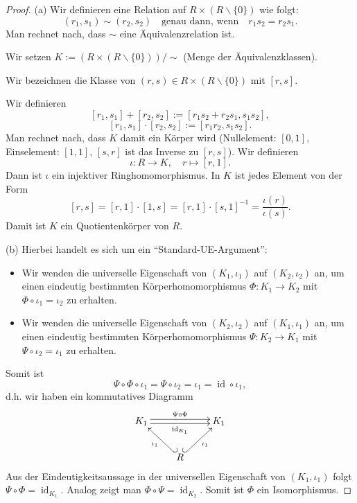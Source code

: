 \documentclass[a4paper, twoside, 11pt, ngerman]{report}
\renewcommand{\setminus}{\smallsetminus}
\DeclareMathOperator{\ident}{id}
\theoremstyle{definistyle}
\theoremstyle{remark}
\begin{document}
\begin{proof}
(a) Wir definieren eine Relation auf $R \times (R \setminus \{0\})$ wie folgt:
\[
(r_1, s_1) \sim (r_2, s_2) \quad \text{genau dann, wenn} \quad r_1 s_2 = r_2 s_1.
\]
Man rechnet nach, dass $\sim$ eine Äquivalenzrelation ist. 

Wir setzen $K := (R \times (R \setminus \{0\}))/\sim$ (Menge der Äquivalenzklassen).

Wir bezeichnen die Klasse von $(r, s) \in R \times (R \setminus \{0\})$ mit $[r, s]$.

Wir definieren 
\[
[r_1, s_1] + [r_2, s_2] := [r_1 s_2 + r_2 s_1, s_1 s_2],
\]
\[
[r_1, s_1] \cdot [r_2, s_2] := [r_1 r_2, s_1 s_2].
\]
Man rechnet nach, dass $K$ damit ein Körper wird (Nullelement: $[0,1]$, Einselement: $[1,1]$, $[s,r]$ ist das Inverse zu $[r,s]$). Wir definieren 
\[\iota \colon R \to K, \quad r \mapsto [r,1].\]
Dann ist $\iota$ ein injektiver Ringhomomorphismus.
In $K$ ist jedes Element von der Form
\[
[r, s] = [r,1] \cdot [1,s] = [r,1] \cdot [s,1]^{-1} = \frac{\iota(r)}{\iota(s)}.
\]
Damit ist $K$ ein Quotientenkörper von $R$.

(b) Hierbei handelt es sich um ein "`Standard-UE-Argument"':
\begin{itemize}
\item Wir wenden die universelle Eigenschaft von $(K_1, \iota_1)$ auf $(K_2, \iota_2)$ an, um einen eindeutig bestimmten Körperhomomorphismus $\Phi \colon K_1 \to K_2$ mit $\Phi \circ \iota_1 = \iota_2$ zu erhalten.
\item Wir wenden die universelle Eigenschaft von $(K_2, \iota_2)$ auf $(K_1, \iota_1)$ an, um einen eindeutig bestimmten Körperhomomorphismus $\Psi \colon K_2 \to K_1$ mit $\Psi \circ \iota_2 = \iota_1$ zu erhalten.
\end{itemize}
Somit ist
\[
\Psi\circ\Phi\circ\iota_1=\Psi\circ\iota_2=\iota_1=\ident\circ\iota_1,
\]
d.h. wir haben ein kommutatives Diagramm
\[
\begin{xy}
\xymatrix{
K_1 \ar@<0.5ex>[rr]^{\Psi\circ\Phi} \ar@<-0.5ex>[rr]_{\operatorname{id}_{K_1}} & & K_1 \\
& R \ar@{_{(}->}[ul]^{\iota_1} \ar@{^{(}->}[ur]_{\iota_1}
}
\end{xy}
\]
Aus der Eindeutigkeitsaussage in der universellen Eigenschaft von $(K_1,\iota_1)$ folgt $\Psi\circ\Phi=\ident_{K_1}$. Analog zeigt man $\Phi\circ\Psi=\ident_{K_2}$. Somit ist $\Phi$ ein Isomorphismus.
\end{proof}
\end{document}
